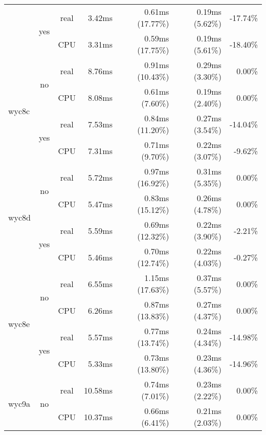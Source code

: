 \documentclass[en]{pracamgr}
\begin{document}
\begin{small}
\begin{longtable}{|l|c|c|r|r|r|r|}
                          \cline{2-7}
                          & \multirow{2}{*}{yes} & real & 3.42ms & 0.61ms (17.77\%) & 0.19ms (5.62\%) & -17.74\% \\*
                          &                      & CPU  & 3.31ms & 0.59ms (17.75\%) & 0.19ms (5.61\%) & -18.40\% \\
\hline
\multirow{4}{*}{wyc8c}    & \multirow{2}{*}{no}  & real & 8.76ms & 0.91ms (10.43\%) & 0.29ms (3.30\%) & 0.00\% \\*
                          &                      & CPU  & 8.08ms & 0.61ms (7.60\%) & 0.19ms (2.40\%) & 0.00\% \\*
                          \cline{2-7}
                          & \multirow{2}{*}{yes} & real & 7.53ms & 0.84ms (11.20\%) & 0.27ms (3.54\%) & -14.04\% \\*
                          &                      & CPU  & 7.31ms & 0.71ms (9.70\%) & 0.22ms (3.07\%) & -9.62\% \\
\hline
\multirow{4}{*}{wyc8d}    & \multirow{2}{*}{no}  & real & 5.72ms & 0.97ms (16.92\%) & 0.31ms (5.35\%) & 0.00\% \\*
                          &                      & CPU  & 5.47ms & 0.83ms (15.12\%) & 0.26ms (4.78\%) & 0.00\% \\*
                          \cline{2-7}
                          & \multirow{2}{*}{yes} & real & 5.59ms & 0.69ms (12.32\%) & 0.22ms (3.90\%) & -2.21\% \\*
                          &                      & CPU  & 5.46ms & 0.70ms (12.74\%) & 0.22ms (4.03\%) & -0.27\% \\
\hline
\multirow{4}{*}{wyc8e}    & \multirow{2}{*}{no}  & real & 6.55ms & 1.15ms (17.63\%) & 0.37ms (5.57\%) & 0.00\% \\*
                          &                      & CPU  & 6.26ms & 0.87ms (13.83\%) & 0.27ms (4.37\%) & 0.00\% \\*
                          \cline{2-7}
                          & \multirow{2}{*}{yes} & real & 5.57ms & 0.77ms (13.74\%) & 0.24ms (4.34\%) & -14.98\% \\*
                          &                      & CPU  & 5.33ms & 0.73ms (13.80\%) & 0.23ms (4.36\%) & -14.96\% \\
\hline
\multirow{4}{*}{wyc9a}    & \multirow{2}{*}{no}  & real & 10.58ms & 0.74ms (7.01\%) & 0.23ms (2.22\%) & 0.00\% \\*
                          &                      & CPU  & 10.37ms & 0.66ms (6.41\%) & 0.21ms (2.03\%) & 0.00\% \\*

\end{longtable}
\end{small}
\end{document}
